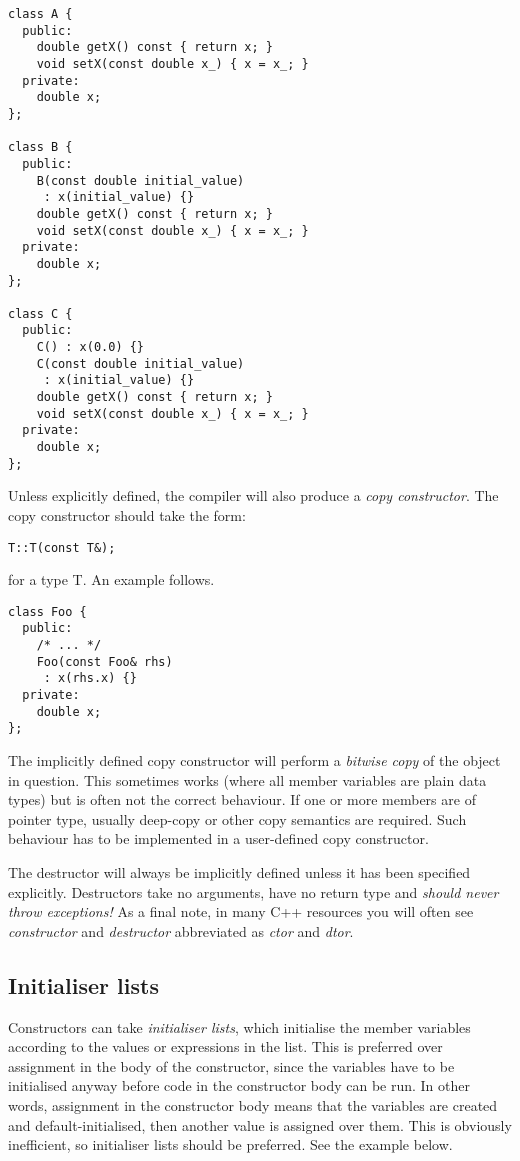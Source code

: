 \documentclass[a4paper]{scrartcl}
\begin{document}
\begin{verbatim}
class A {
  public:
    double getX() const { return x; }
    void setX(const double x_) { x = x_; }
  private:
    double x;
};

class B {
  public:
    B(const double initial_value)
     : x(initial_value) {}
    double getX() const { return x; }
    void setX(const double x_) { x = x_; }
  private:
    double x;
};

class C {
  public:
    C() : x(0.0) {}
    C(const double initial_value)
     : x(initial_value) {}
    double getX() const { return x; }
    void setX(const double x_) { x = x_; }
  private:
    double x;
};
\end{verbatim}

Unless explicitly defined, the compiler will also produce a \emph{copy constructor}. The copy constructor should take the form:

\begin{verbatim}
T::T(const T&);
\end{verbatim}

for a type T. An example follows.

\begin{verbatim}
class Foo {
  public:
    /* ... */
    Foo(const Foo& rhs)
     : x(rhs.x) {}
  private:
    double x;
};
\end{verbatim}

The implicitly defined copy constructor will perform a \emph{bitwise copy} of the object in question. This sometimes works (where all member variables are plain data types) but is often not the correct behaviour. If one or more members are of pointer type, usually deep-copy or other copy semantics are required. Such behaviour has to be implemented in a user-defined copy constructor.

The destructor will always be implicitly defined unless it has been specified explicitly. Destructors take no arguments, have no return type and \emph{should never throw exceptions!} As a final note, in many C++ resources you will often see \emph{constructor} and \emph{destructor} abbreviated as \emph{ctor} and \emph{dtor}.

\subsection{Initialiser lists}
Constructors can take \emph{initialiser lists}, which initialise the member variables according to the values or expressions in the list. This is preferred over assignment in the body of the constructor, since the variables have to be initialised anyway before code in the constructor body can be run. In other words, assignment in the constructor body means that the variables are created and default-initialised, then another value is assigned over them. This is obviously inefficient, so initialiser lists should be preferred. See the example below.
\end{document}
